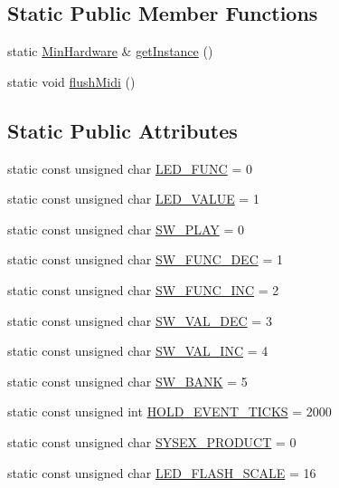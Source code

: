 \subsection*{Static Public Member Functions}
\begin{DoxyCompactItemize}
\item 
static \hyperlink{class_min_hardware}{Min\+Hardware} \& \hyperlink{class_min_hardware_a47f2709e0cba6ed3b9d35fdd8baf8765}{get\+Instance} ()
\item 
static void \hyperlink{class_min_hardware_a21e147f121461594f295852e0a856b64}{flush\+Midi} ()
\end{DoxyCompactItemize}
\subsection*{Static Public Attributes}
\begin{DoxyCompactItemize}
\item 
static const unsigned char \hyperlink{class_min_hardware_a22f9e8bf1d6dea2ed8b1c98bf97fecc6}{L\+E\+D\+\_\+\+F\+U\+NC} = 0
\item 
static const unsigned char \hyperlink{class_min_hardware_ad31c41e9a6216131acefd448c8daa305}{L\+E\+D\+\_\+\+V\+A\+L\+UE} = 1
\item 
static const unsigned char \hyperlink{class_min_hardware_a1715e93b246055f81609acf2fafd340a}{S\+W\+\_\+\+P\+L\+AY} = 0
\item 
static const unsigned char \hyperlink{class_min_hardware_a24e40d1b4dd921bcb58814c754f54d65}{S\+W\+\_\+\+F\+U\+N\+C\+\_\+\+D\+EC} = 1
\item 
static const unsigned char \hyperlink{class_min_hardware_a012e3565b4c6eafe595bae95b9ae9dfd}{S\+W\+\_\+\+F\+U\+N\+C\+\_\+\+I\+NC} = 2
\item 
static const unsigned char \hyperlink{class_min_hardware_aa01f74ebc2750feda3252f856cb7c664}{S\+W\+\_\+\+V\+A\+L\+\_\+\+D\+EC} = 3
\item 
static const unsigned char \hyperlink{class_min_hardware_ae37680120a307b535dffa98f7aaeecf0}{S\+W\+\_\+\+V\+A\+L\+\_\+\+I\+NC} = 4
\item 
static const unsigned char \hyperlink{class_min_hardware_a7cbeb3696cce376d0e1922d35473faf1}{S\+W\+\_\+\+B\+A\+NK} = 5
\item 
static const unsigned int \hyperlink{class_min_hardware_ae90fda3fb4bdf7ffb4268ae487cd8334}{H\+O\+L\+D\+\_\+\+E\+V\+E\+N\+T\+\_\+\+T\+I\+C\+KS} = 2000
\item 
static const unsigned char \hyperlink{class_min_hardware_a066765ceef59905283cebee0df489426}{S\+Y\+S\+E\+X\+\_\+\+P\+R\+O\+D\+U\+CT} = 0
\item 
static const unsigned char \hyperlink{class_min_hardware_aaa04f82d875b684d384d9404e70bb632}{L\+E\+D\+\_\+\+F\+L\+A\+S\+H\+\_\+\+S\+C\+A\+LE} = 16
\end{DoxyCompactItemize}


